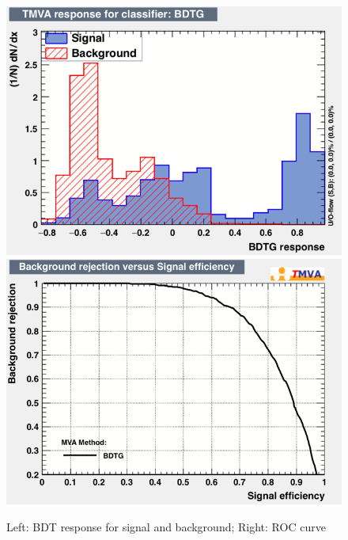 \begin{figure}[h!]
	\includegraphics[scale=0.40]{Plots/BDT_Performance/Trial1/dataset/plots/mva_BDTG.png}%
	\includegraphics[scale=0.40]{Plots/BDT_Performance/Trial1/dataset/plots/rejBvsS.png}
	\caption{Left: BDT response for signal and background; Right: ROC curve}
\end{figure}


